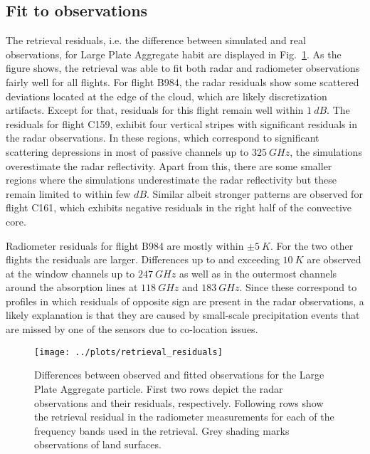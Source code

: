 \documentclass[journal abbreviation, manuscript]{copernicus}
\begin{document}
\subsection{Fit to observations}

The retrieval residuals, i.e. the difference between simulated and real
observations, for Large Plate Aggregate habit are displayed in
Fig.~\ref{fig:residuals}. As the figure shows, the retrieval was able to fit
both radar and radiometer observations fairly well for all flights. For flight
B984, the radar residuals show some scattered deviations located at the edge of
the cloud, which are likely discretization artifacts. Except for that, residuals
for this flight remain well within $1\ \unit{dB}$. The residuals for flight
C159, exhibit four vertical stripes with significant residuals in the radar
observations. In these regions, which correspond to significant scattering
depressions in most of passive channels up to $325\ \unit{GHz}$, the simulations
overestimate the radar reflectivity. Apart from this, there are some smaller
regions where the simulations underestimate the radar reflectivity but these
remain limited to within few $\unit{dB}$. Similar albeit stronger patterns are
observed for flight C161, which exhibits negative residuals in the right half of
the convective core.


Radiometer residuals for flight B984 are mostly within $\pm 5\ \unit{K}$. For
the two other flights the residuals are larger. Differences up to and exceeding
$10\ \unit{K}$ are observed at the window channels up to $247\ \unit{GHz}$ as
well as in the outermost channels around the absorption lines at
$118\ \unit{GHz}$ and $183\ \unit{GHz}$. Since these correspond to profiles in
which residuals of opposite sign are present in the radar observations, a likely
explanation is that they are caused by small-scale precipitation events that are
missed by one of the sensors due to co-location issues.


\begin{figure}[!hbpt]
  \centering
  \texttt{[image: ../plots/retrieval\_residuals]}
  \caption{Differences between observed and fitted observations for the Large
    Plate Aggregate particle. First two rows depict the radar observations and
    their residuals, respectively. Following rows show the retrieval residual in
    the radiometer measurements for each of the frequency bands used in the
    retrieval. Grey shading marks observations of land surfaces. }
  \label{fig:residuals}
\end{figure}
\end{document}
